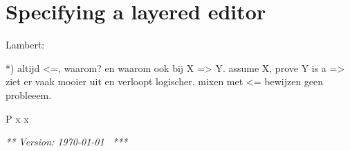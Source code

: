 \chapter{Specifying a layered editor}
\label{chap:formalSpec}


\bc
Lambert:

*) altijd <=, waarom? en waarom ook bij X => Y. assume X, prove Y is a =>
ziet er vaak mooier uit en verloopt logischer. mixen met <= bewijzen geen probleeem.

P x   \eq   x 



\ec

{\em *** Version: \today~ ***}







%
%
%
%





